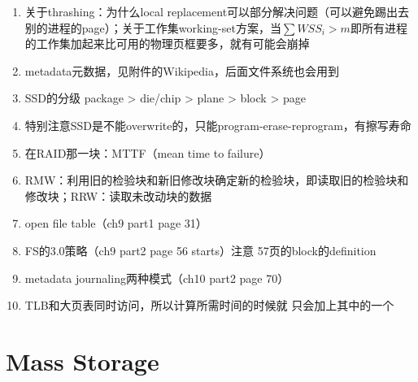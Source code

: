 \documentclass[]{report}
\begin{document}
\begin{enumerate}
		\item 关于thrashing：为什么local replacement可以部分解决问题（可以避免踢出去别的进程的page）；关于工作集working-set方案，当$\sum WSS_i>m$即所有进程的工作集加起来比可用的物理页框要多，就有可能会崩掉
		\item metadata元数据，见附件的Wikipedia，后面文件系统也会用到
		\item SSD的分级 package > die/chip > plane > block > page
		\item 特别注意SSD是不能overwrite的，只能program-erase-reprogram，有擦写寿命
		\item 在RAID那一块：MTTF（mean time to failure）
		\item RMW：利用旧的检验块和新旧修改块确定新的检验块，即读取旧的检验块和修改块；RRW：读取未改动块的数据
		\item open file table（ch9 part1 page 31）
		\item FS的3.0策略（ch9 part2 page 56 starts）注意 57页的block的definition
		\item metadata journaling两种模式（ch10 part2 page 70）
		\item TLB和大页表同时访问，所以计算所需时间的时候就 只会加上其中的一个
	\end{enumerate}

	\chapter{Mass Storage}
\end{document}
